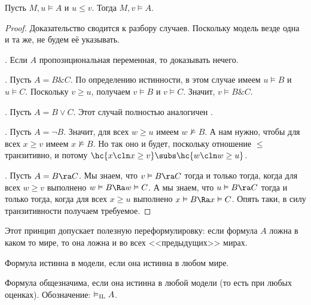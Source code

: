 \documentclass[a4paper,draft]{article}
\let\amper\&
\def\&{\mathbin{\amper}}
\begin{document}
\begin{lemma}
  Пусть $M,u \vDash A$ и $ u \le v$. Тогда $M, v \vDash A$.
\end{lemma}
\begin{proof}
  Доказательство сводится к разбору случаев. Поскольку модель везде одна и та же, не будем её указывать.

  . Если $A$ пропозициональная переменная, то доказывать нечего.

  . Пусть $A = B \& C$. По определению истинности, в этом случае имеем $u \vDash B$ и $u \vDash C$.
  Поскольку $v \ge u$, получаем $v \vDash B$ и $v \vDash C$. Значит, $v \vDash B \& C$.

  . Пусть $A = B \vee C$. Этот случай полностью аналогичен .

  . Пусть $A = \neg B$. Значит, для всех $w \ge u$ имеем $w \nvDash B$.
  А нам нужно, чтобы для всех $x \ge v$ имеем $x \nvDash B$. Но так оно и будет,
  поскольку отношение $\le$ транзитивно, и потому $\hc{x\cln x \ge v} \subs \hc{w\cln w \ge u}$.

  . Пусть $A = B \ra C$. Мы знаем, что $v \vDash B \ra C$ тогда и только тогда, когда для всех $w \ge v$
  выполнено $w \vDash B \Ra w \vDash C$. А мы знаем, что $u \vDash B \ra C$ тогда и только тогда, когда
  для всех $x \ge u$ выполнено $x \vDash B \Ra x \vDash C$. Опять таки, в силу транзитивности получаем
  требуемое.
\end{proof}

\begin{note}
  Этот принцип допускает полезную переформулировку: если формула $A$ ложна в каком то мире,
  то она ложна и во всех <<предыдущих>> мирах.
\end{note}

\begin{df}
  Формула истинна в модели, если она истинна в любом мире.
\end{df}

\begin{df}
  Формула общезначима, если она истинна в любой модели (то есть при любых оценках).
  Обозначение: $\vDash_{\rm IL} A$.
\end{df}
\end{document}
